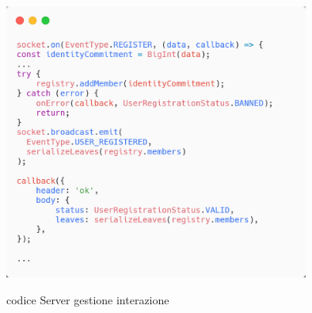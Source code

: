 \begin{figure}[H]
    \centering
    \includegraphics[width=10cm]{./chapters/3.poc/images/3.2.Server.png}
    \label{fig:2.Server}
    \captionsetup{justification=centering}
    \caption{codice Server gestione interazione}
\end{figure}

